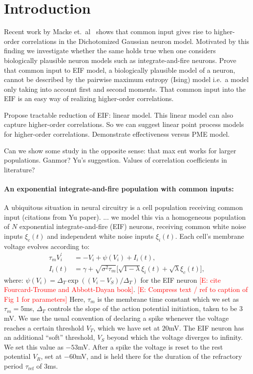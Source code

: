 \documentclass[%
 reprint,
 amsmath,amssymb,
 aps,
floatfix,
]{revtex4-1}
\newcommand{\Ecomment}[1]{\textcolor{red}{[E: #1]}}
\begin{document}
\section{\label{sec:intro}Introduction}%
Recent work by Macke et.~al~\cite{Macke:2011gw} shows that common input gives rise to higher-order correlations in the Dichotomized Gaussian neuron model. Motivated by this finding we investigate whether the same holds true when one considers biologically plausible neuron models such as integrate-and-fire neurons. Prove that common input to EIF model, a biologically plausible model of a neuron, cannot be described by the pairwise maximum entropy (Ising) model i.e.~a model only taking into account first and second moments. That common input into the EIF is an easy way of realizing higher-order correlations.

Propose tractable reduction of EIF: linear model. This linear model can also capture higher-order correlations. So we can suggest linear point process models for higher-order correlations. Demonstrate effectiveness versus PME model.

Can we show some study in the opposite sense: that max ent works for larger populations. Ganmor? Yu's suggestion.
Values of correlation coefficients in literature?
\colorbox{BrickRed}{\color{White}{Intentionally incomplete!}}
\colorbox{BrickRed}{\color{White}{Will finish once main text is vetted.}}

\bigskip

\noindent \paragraph*{An exponential integrate-and-fire population with common inputs:}

A ubiquitous situation in neural circuitry is a cell population receiving common input (citations from Yu paper). ... we model this via a homogeneous population of $N$ exponential integrate-and-fire (EIF) neurons, receiving common white noise inputs $\xi_c(t)$ and independent white noise inputs $\xi_i(t)$.  Each cell's membrane voltage evolves according to: 
\begin{align}
\label{eifsde}
\tau_m V_i^\prime &= -V_i +\psi(V_i)+I_i(t),\\
I_i(t) &= \gamma+\sqrt{\sigma^2\tau_m}\big[\sqrt{1-\lambda}\xi_i(t)+\sqrt{\lambda}\xi_c(t)\big] \nonumber,
\end{align}
where: $\psi(V_i) =\Delta_T \exp{\left((V_i - V_S)/\Delta_T\right)}$ for the EIF neuron \Ecomment{cite Fourcard-Troume and Abbott-Dayan book}.  \Ecomment{Compress text / ref to caption of Fig 1 for parameters} Here, $\tau_m$ is the membrane time constant which we set as $\tau_m = 5$ms, $\Delta_T$ controls the slope of the action potential initiation, taken to be $3$mV. We use the usual convention of declaring a spike whenever the voltage reaches a certain threshold $V_T$, which we have set at $20$mV. The EIF neuron has an additional ``soft'' threshold, $V_S$ beyond which the voltage diverges to infinity. We set this value as $-53$mV. After a spike the voltage is reset to the rest potential $V_R$, set at $-60$mV, and is held there for the duration of the refractory period $\tau_{\text{ref}}$ of $3$ms.
\end{document}
